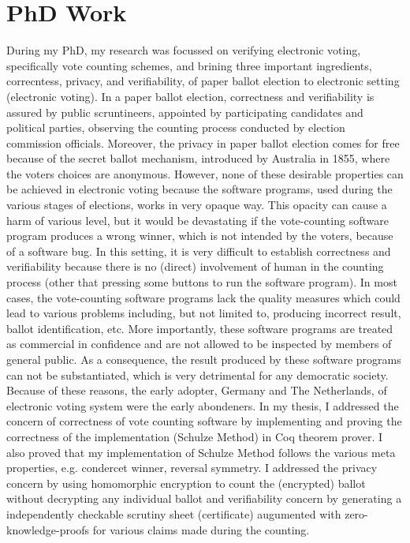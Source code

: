 \documentclass{article}
\begin{document}
\section{PhD Work}
During my PhD, my research was focussed on verifying electronic voting, specifically vote counting schemes, 
and brining three important ingredients, correcntess, 
privacy, and verifiability, of paper ballot election to electronic setting (electronic voting). In a paper ballot election, correctness and verifiability is
assured by public scruntineers, appointed by participating candidates and political parties, observing the counting process conducted by 
election commission officials. Moreover, the privacy in paper ballot election comes for free because of the secret ballot mechanism, introduced 
by Australia in 1855, where the voters choices are anonymous. However, none of 
these desirable properties can be achieved in electronic voting because the software programs, used during the 
various stages of  elections, works in very opaque way. This opacity can cause a harm of various level, but 
it would be devastating if the vote-counting 
software program produces a wrong winner, which is not intended by the voters, because of a software bug. 
In this setting, it is very difficult to 
establish correctness and verifiability because there is no (direct) involvement of human in the counting process (other 
that pressing some buttons to run the software program).  
In most cases, the vote-counting software programs lack the quality measures which could lead to various 
problems including, but not limited to,  producing incorrect result, ballot identification, etc.  More importantly, these software programs
are treated as commercial in confidence and are not allowed to be inspected by members of general public. 
As a consequence, the result produced by these software programs can not be substantiated, which is very detrimental 
for any democratic society. Because of these reasons, the early adopter, Germany and The Netherlands, of electronic 
voting system were the early abondeners. In my thesis, I addressed the concern of correctness of vote counting 
software by implementing  and proving the correctness of the implementation (Schulze Method) in Coq theorem prover. 
I also proved that my implementation of Schulze Method follows the various meta properties, e.g. condercet winner, reversal symmetry.
I addressed the privacy concern by using homomorphic encryption to count the (encrypted) ballot without decrypting 
any individual ballot and  verifiability concern by generating a independently checkable scrutiny sheet (certificate) 
augumented with zero-knowledge-proofs for various claims made during the counting. 
\end{document}
